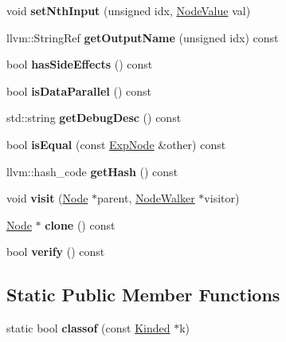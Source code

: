 \begin{DoxyCompactItemize}
void {\bfseries set\+Nth\+Input} (unsigned idx, \hyperlink{structglow_1_1_node_value}{Node\+Value} val)
\item 
\mbox{\label{classglow_1_1_exp_node_a8d64024c5f29d87920db0f09c3d97cbe}} 
llvm\+::\+String\+Ref {\bfseries get\+Output\+Name} (unsigned idx) const
\item 
\mbox{\label{classglow_1_1_exp_node_a9988b27e7a27fd00e2b06bbb508ca94b}} 
bool {\bfseries has\+Side\+Effects} () const
\item 
\mbox{\label{classglow_1_1_exp_node_a137a258676e6b085c41a8ed9a6d87a91}} 
bool {\bfseries is\+Data\+Parallel} () const
\item 
\mbox{\label{classglow_1_1_exp_node_a072c3cd85088fadaa2baf681dccca28d}} 
std\+::string {\bfseries get\+Debug\+Desc} () const
\item 
\mbox{\label{classglow_1_1_exp_node_a5fc1dec839e2455aa9d611e4f75c64b4}} 
bool {\bfseries is\+Equal} (const \hyperlink{classglow_1_1_exp_node}{Exp\+Node} \&other) const
\item 
\mbox{\label{classglow_1_1_exp_node_a430779f54cb8a2a109b73231f4d8dbe6}} 
llvm\+::hash\+\_\+code {\bfseries get\+Hash} () const
\item 
\mbox{\label{classglow_1_1_exp_node_ab91851bae6229692cf3a3847b31a952e}} 
void {\bfseries visit} (\hyperlink{classglow_1_1_node}{Node} $\ast$parent, \hyperlink{classglow_1_1_node_walker}{Node\+Walker} $\ast$visitor)
\item 
\mbox{\label{classglow_1_1_exp_node_ab9221487e4e3a5bdba5d87f4ef9ed8ff}} 
\hyperlink{classglow_1_1_node}{Node} $\ast$ {\bfseries clone} () const
\item 
\mbox{\label{classglow_1_1_exp_node_ac26dd0d95afabdab85fe5138d9b314e0}} 
bool {\bfseries verify} () const
\end{DoxyCompactItemize}
\subsection*{Static Public Member Functions}
\begin{DoxyCompactItemize}
\item 
\mbox{\label{classglow_1_1_exp_node_a5f3066aa5a7e476db95286cbaac7fe0a}} 
static bool {\bfseries classof} (const \hyperlink{classglow_1_1_kinded}{Kinded} $\ast$k)
\end{DoxyCompactItemize}
